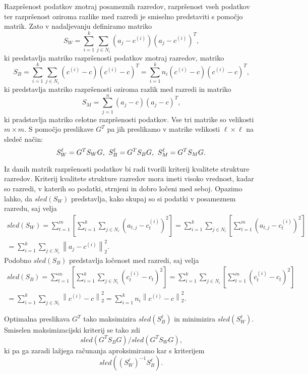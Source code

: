 \documentclass[mat1]{article}
\newcommand{\norm}[1]{\left\lVert#1\right\rVert}
\begin{document}
Razpršenost podatkov znotraj posameznih razredov, razpršenost vseh podatkov ter razpršenost oziroma razlike med razredi je smiselno predstaviti s pomočjo matrik. Zato v nadaljevanju definiramo matriko
$$S_W = \sum_{i = 1}^{k} \sum_{j \in N_i}(a_j - c^{(i)})(a_j - c^{(i)})^T\text{,}$$
ki predstavlja matriko razpršenosti podatkov znotraj razredov, matriko
$$S_B = \sum_{i = 1}^{k} \sum_{j \in N_i} ( c^{(i)} - c)( c^{(i)} - c)^T = \sum_{i = 1}^{k} n_i ( c^{(i)} - c)( c^{(i)} - c)^T \text{,}$$
ki predstavlja matriko razpršenosti oziroma razlik med razredi in matriko
$$S_M = \sum_{j = 1}^{n} (a_j - c)(a_j - c)^T \text{,}$$
ki pradstavlja matriko celotne razpršenosti podatkov. Vse tri matrike so velikosti $m \times m$.
S pomočjo preslikave $G^T$ pa jih preslikamo v matrike velikosti $\ell \times \ell$ na sledeč način:
$$ S_{W}^{\ell} = G^T S_W G \text{,} \hspace{2mm} S_{B}^{\ell} = G^T S_B G \text{,} \hspace{2mm} S_{M}^{\ell} = G^T S_M G \text{.}
$$

Iz danih matrik razpršenosti podatkov bi radi tvorili kriterij kvalitete strukture razredov. Kriterij kvalitete strukture razredov mora imeti visoko vrednost, kadar so razredi, v katerih so podatki, strnjeni in dobro ločeni med seboj. Opazimo lahko, da $sled(S_W)$ predstavlja, kako skupaj so si podatki v posameznem razredu, saj velja
\begin{gather*} 
sled(S_W) = \sum_{t=1}^{m} \left[ \sum_{i = 1}^{k} \sum_{j \in N_i}(a_{t, j} - c_t^{(i)})^2 \right]
= \sum_{i = 1}^{k} \sum_{j \in N_i} \left[ \sum_{t=1}^{m} (a_{t, j} - c_t^{(i)})^2 \right] \\
= \sum_{i = 1}^{k} \sum_{j \in N_i} \norm{ a_j - c^{(i)}}_2^2 \text{.}
\end{gather*}
Podobno $sled(S_B)$ predstavlja ločenost med razredi, saj velja
\begin{gather*} 
sled(S_B) = \sum_{t=1}^{m} \left[ \sum_{i = 1}^{k} \sum_{j \in N_i}(c_t^{(i)} - c_t)^2\right]
= \sum_{i = 1}^{k} \sum_{j \in N_i} \left[ \sum_{t=1}^{m} (c_t^{(i)} - c_t)^2 \right] \\
= \sum_{i = 1}^{k} \sum_{j \in N_i} \norm{ c^{(i)} - c}_2^2 
= \sum_{i = 1}^{k} n_i \norm{ c^{(i)} - c}_2^2
\text{.}
\end{gather*}

Optimalna preslikava $G^T$ tako maksimizira $sled(S_{B}^{\ell})$ in minimizira $sled(S_{W}^{\ell})$. Smiselen maksimizacijski kriterij se tako zdi $$sled( G^T S_B G) / sled( G^T S_W G) \text{,}$$ ki pa ga zaradi lažjega računanja aproksimiramo kar s kriterijem $$sled((S_W^\ell)^{-1}S_B^\ell) \text{.}$$
\end{document}
